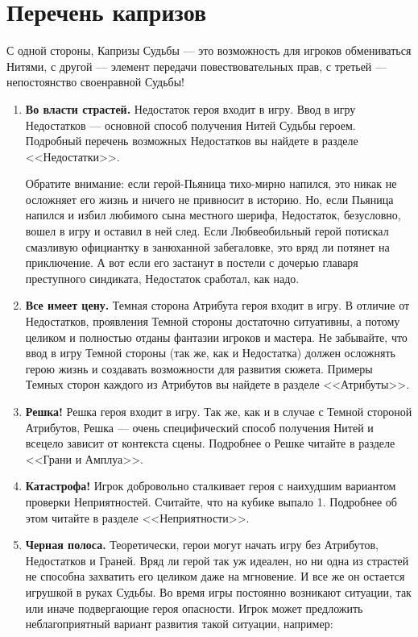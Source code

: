 \section{Перечень капризов}
С одной стороны, Капризы Судьбы — это возможность для игроков обмениваться Нитями, с другой — элемент передачи повествовательных прав, с третьей — непостоянство своенравной Судьбы!
\begin{enumerate}
\item \textbf{Во власти страстей.}
Недостаток героя входит в игру. Ввод в игру Недостатков — основной способ получения Нитей Судьбы героем. Подробный перечень возможных Недостатков вы найдете в разделе <<Недостатки>>.
\begin{tcolorbox}
Обратите внимание: если герой-Пьяница тихо-мирно напился, это никак не осложняет его жизнь и ничего не привносит в историю. Но, если Пьяница напился и избил любимого сына местного шерифа, Недостаток, безусловно, вошел в игру и оставил в ней след. Если Любвеобильный герой потискал смазливую официантку в занюханной забегаловке, это вряд ли потянет на приключение. А вот если его застанут в постели с дочерью главаря преступного синдиката, Недостаток сработал, как надо.
\end{tcolorbox}
\item \textbf{Все имеет цену.}
Темная сторона Атрибута героя входит в игру. В отличие от Недостатков, проявления Темной стороны достаточно ситуативны, а потому целиком и полностью отданы фантазии игроков и мастера. Не забывайте, что ввод в игру Темной стороны (так же, как и Недостатка) должен осложнять герою жизнь и создавать возможности для развития сюжета. Примеры Темных сторон каждого из Атрибутов вы найдете в разделе <<Атрибуты>>.
\item \textbf{Решка!}
Решка героя входит в игру. Так же, как и в случае с Темной стороной Атрибутов, Решка — очень специфический способ получения Нитей и всецело зависит от контекста сцены. Подробнее о Решке читайте в разделе <<Грани и Амплуа>>.
\item \textbf{Катастрофа!}
Игрок добровольно сталкивает героя с наихудшим вариантом проверки Неприятностей. Считайте, что на кубике выпало 1. Подробнее об этом читайте в разделе <<Неприятности>>.
\item \textbf{Черная полоса.}
Теоретически, герои могут начать игру без Атрибутов, Недостатков и Граней. Вряд ли герой так уж идеален, но ни одна из страстей не способна захватить его целиком даже на мгновение. И все же он остается игрушкой в руках Судьбы.
\newline Во время игры постоянно возникают ситуации, так или иначе подвергающие героя опасности. Игрок может предложить неблагоприятный вариант развития такой ситуации, например:

\end{enumerate}
